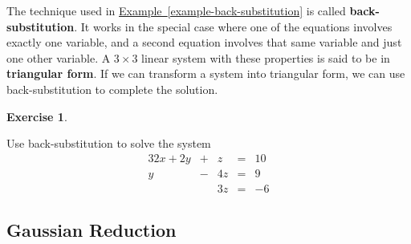 \documentclass[10pt,]{book}
\newcommand{\terminology}[1]{\textbf{#1}}
\theoremstyle{plain}
\theoremstyle{definition}
\theoremstyle{definition}
\theoremstyle{definition}
\theoremstyle{definition}
\newtheorem{exercise}[theorem]{Exercise}
\numberwithin{equation}{section}
\newcommand{\amp}{ & }
\begin{document}
	The technique used in \hyperref[example-back-substitution]{Example~\ref{example-back-substitution}} is called \terminology{back-substitution}. It works in the special case where one of the equations involves exactly one variable, and a second equation involves that same variable and just one other variable. A \(3\times 3\) linear system with these properties is said to be in \terminology{triangular form}. If we can transform a system into triangular form, we can use back-substitution to complete the solution.
%
\begin{exercise}\label{exercise-10}

		Use back-substitution to solve the system
		\begin{alignat*}{3}
 2x +{}  2y \amp {}+{} \amp z \amp {}={} \amp 10\\
          y  \amp {}-{} \amp  4z \amp {}={} \amp 9\\
        \amp {}{} \amp 3z \amp {}={} \amp -6
\end{alignat*}
\end{exercise}
\typeout{************************************************}
\typeout{************************************************}
\subsection[Gaussian Reduction]{Gaussian Reduction}\label{subsection-7}
\end{document}
